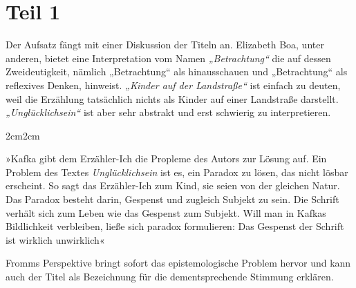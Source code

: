 \documentclass[12pt,a4paper]{article}
\newenvironment{longquote}
{%
    \vspace{-1.5em}
    \begin{adjustwidth}{2cm}{2cm}
        \fontsize{10}{12}\selectfont
        \singlespacing
        \itshape
    }
{%
    \end{adjustwidth}
}
\begin{document}
\section{Teil 1}
Der Aufsatz fängt mit einer Diskussion der Titeln an. Elizabeth Boa\autocite{boa2014}, unter anderen\autocite[see 105]{fromm}, bietet eine Interpretation vom Namen \textit{„Betrachtung“} die auf dessen Zweideutigkeit, nämlich „Betrachtung“ als hinausschauen und „Betrachtung“ als reflexives Denken, hinweist. \textit{„Kinder auf der Landstraße“} ist einfach zu deuten, weil die Erzählung tatsächlich nichts als Kinder auf einer Landstraße darstellt. \textit{„Unglücklichsein“} ist aber sehr abstrakt und erst schwierig zu interpretieren.\par 

\vspace{0.5em}
\begin{longquote}
»Kafka gibt dem Erzähler-Ich die Propleme des Autors zur Lösung auf. Ein Problem des Textes \textit{Unglücklichsein} ist es, ein Paradox zu lösen, das nicht lösbar erscheint. So sagt das Erzähler-Ich zum Kind, sie seien von der gleichen Natur. Das Paradox besteht darin, Gespenst und zugleich Subjekt zu sein. Die Schrift verhält sich zum Leben wie das Gespenst zum Subjekt. Will man in Kafkas Bildlichkeit verbleiben, ließe sich paradox formulieren: Das Gespenst der Schrift ist wirklich unwirklich«\autocite[117]{fromm}
\end{longquote}

Fromms Perspektive bringt sofort das epistemologische Problem hervor und kann auch der Titel als Bezeichnung für die dementsprechende Stimmung erklären.
\end{document}
